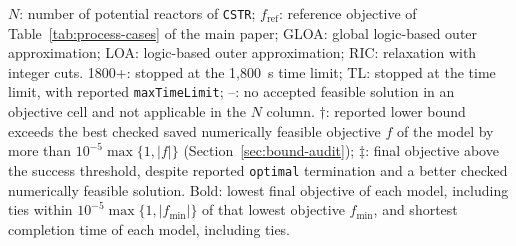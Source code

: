 \begin{table}[htbp]
\begin{threeparttable}
\begin{tablenotes}[flushleft]\footnotesize
\item \(N\): number of potential reactors of \texttt{CSTR}; \(f_{\mathrm{ref}}\): reference objective of Table~\ifdefined\manuscriptwithsupplement\ref{tab:process-cases}\fi{} of the main paper; GLOA: global logic-based outer approximation; LOA: logic-based outer approximation; RIC: relaxation with integer cuts.
1800+: stopped at the 1,800~s time limit; TL: stopped at the time limit, with reported \texttt{maxTimeLimit}; --: no accepted feasible solution in an objective cell and not applicable in the \(N\) column.
\(\dagger\): reported lower bound exceeds the best checked saved numerically feasible objective \(f\) of the model by more than \(10^{-5}\max\{1,|f|\}\) (Section~\ref{sec:bound-audit}); \(\ddagger\): final objective above the success threshold, despite reported \texttt{optimal} termination and a better checked numerically feasible solution.
Bold: lowest final objective of each model, including ties within \(10^{-5}\max\{1,|f_{\min}|\}\) of that lowest objective \(f_{\min}\), and shortest completion time of each model, including ties.
\end{tablenotes}
\end{threeparttable}
\end{table}
\FloatBarrier

